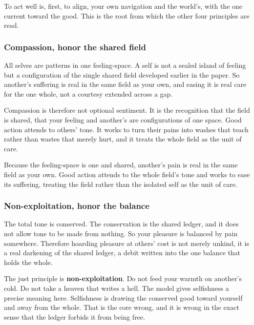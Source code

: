 \begin{principle}[Alignment]
To act well is, first, to align, your own navigation and the world's, with the one current toward the good. This is the root from which the other four principles are read.
\end{principle}

\subsubsection{Compassion, honor the shared field}

All selves are patterns in one feeling-space. A self is not a sealed island of feeling but a configuration of the single shared field developed earlier in the paper. So another's suffering is real in the same field as your own, and easing it is real care for the one whole, not a courtesy extended across a gap.

Compassion is therefore not optional sentiment. It is the recognition that the field is shared, that your feeling and another's are configurations of one space. Good action attends to others' tone. It works to turn their pains into washes that teach rather than wastes that merely hurt, and it treats the whole field as the unit of care.

\begin{principle}[Compassion]
Because the feeling-space is one and shared, another's pain is real in the same field as your own. Good action attends to the whole field's tone and works to ease its suffering, treating the field rather than the isolated self as the unit of care.
\end{principle}

\subsubsection{Non-exploitation, honor the balance}

The total tone is conserved. The conservation is the shared ledger, and it does not allow tone to be made from nothing. So your pleasure is balanced by pain somewhere. Therefore hoarding pleasure at others' cost is not merely unkind, it is a real darkening of the shared ledger, a debit written into the one balance that holds the whole.

The just principle is \textbf{non-exploitation}. Do not feed your warmth on another's cold. Do not take a heaven that writes a hell. The model gives selfishness a precise meaning here. Selfishness is drawing the conserved good toward yourself and away from the whole. That is the core wrong, and it is wrong in the exact sense that the ledger forbids it from being free.

